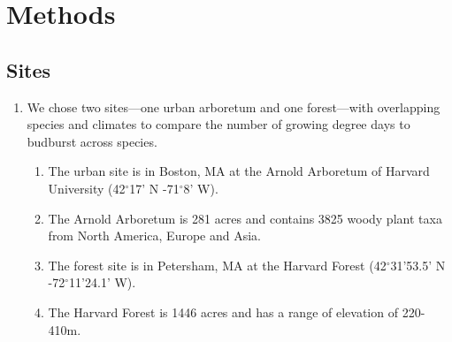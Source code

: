 \documentclass{article}\usepackage[]{graphicx}\usepackage[]{color}
\begin{document}
\section*{Methods}
\subsection*{Sites}
\begin{enumerate}
\item We chose two sites---one urban arboretum and one forest---with overlapping species and climates to compare the number of growing degree days to budburst across species. 
  \begin{enumerate}
  \item The urban site is in Boston, MA at the Arnold Arboretum of Harvard University (42$^{\circ}$17' N -71$^{\circ}$8' W).
  \item The Arnold Arboretum is 281 acres and contains 3825 woody plant taxa from North America, Europe and Asia.
  \item The forest site is in Petersham, MA at the Harvard Forest (42$^{\circ}$31'53.5' N -72$^{\circ}$11'24.1' W).
  \item The Harvard Forest is 1446 acres and has a range of elevation of 220-410m. 
  \end{enumerate}
\end{enumerate}
\end{document}
